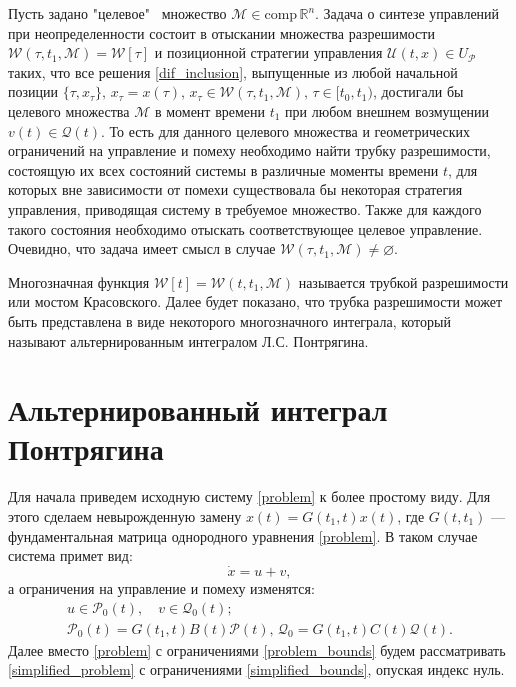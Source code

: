 Пусть задано "целевое" \ множество \( \mathcal{M} \in \text{comp} \,
 \mathbb{R}^n \). Задача о синтезе управлений при неопределенности состоит 
 в отыскании множества разрешимости \( \mathcal{W}(\tau, t_1, \mathcal{M}) = 
 \mathcal{W}[\tau] \) и позиционной стратегии управления
 \( \mathcal{U}(t,x) \in U_{\mathcal{P}} \) таких, что все решения
 \eqref{dif_inclusion}, выпущенные из любой начальной позиции \( \{\tau, 
 x_{\tau}\}, \, x_{\tau} = x(\tau), \, x_{\tau} \in \mathcal{W}(\tau, t_1, 
 \mathcal{M}), \, \tau \in [t_0, t_1) \), достигали бы целевого множества
 \( \mathcal{M} \) в момент времени \( t_1 \) при любом внешнем возмущении
 \( v(t) \in \mathcal{Q}(t) \). То есть для данного целевого множества и 
 геометрических ограничений на управление и помеху необходимо найти трубку
 разрешимости, состоящую их всех состояний системы в различные моменты времени
 \( t \), для которых вне зависимости от помехи существовала бы некоторая 
 стратегия управления, приводящая систему в требуемое множество. Также 
 для каждого такого состояния необходимо отыскать соответствующее целевое 
 управление. Очевидно, что задача имеет смысл в случае
 \( \mathcal{W}(\tau, t_1, \mathcal{M}) \ne \varnothing \).
 
Многозначная функция \( \mathcal{W}[t] = \mathcal{W}(t, t_1,\mathcal{M}) \) 
 называется трубкой разрешимости или мостом Красовского. Далее будет показано,
 что трубка разрешимости может быть представлена в виде некоторого многозначного
 интеграла, который называют альтернированным интегралом Л.С. Понтрягина.

\section{Альтернированный интеграл Понтрягина}
Для начала приведем исходную систему \eqref{problem} к более простому виду.
 Для этого сделаем невырожденную замену \( x(t) = G(t_1, t)x(t) \), где 
 \( G(t,t_1) \) --- фундаментальная матрица однородного уравнения 
 \eqref{problem}. В таком случае система примет вид:
\begin{equation}\label{simplified_problem}
    \dot{x} = u + v,
\end{equation}
 а ограничения на управление и помеху изменятся:
\begin{equation}\label{simplified_bounds}
 \begin{gathered}
    u \in \mathcal{P}_0(t), \quad v \in \mathcal{Q}_0(t); \\
    \mathcal{P}_0(t) = G(t_1, t) B(t) \mathcal{P}(t), \, \mathcal{Q}_0 = 
     G(t_1,t)C(t)\mathcal{Q}(t).
 \end{gathered}
\end{equation}
Далее вместо \eqref{problem} с ограничениями \eqref{problem_bounds} будем 
 рассматривать \eqref{simplified_problem} с ограничениями \eqref{simplified_bounds},
 опуская индекс нуль.

